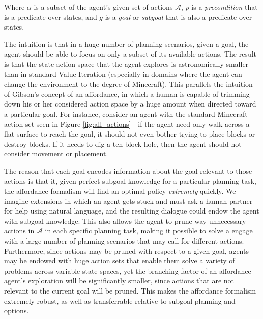 \documentclass[]{article}
\begin{document}
Where $\alpha$ is a subset of the agent's given set of actions 
$\mathcal{A}$, $p$ is a {\it precondition} that is a predicate over states, 
and $g$ is a {\it goal} or {\it subgoal} that is also a predicate over states.

The intuition is that in a huge number of planning scenarios, given a goal, the agent 
should be able to focus on only a subset of its available actions. The result is that the 
state-action space that the agent explores is astronomically smaller than in standard 
Value Iteration (especially in domains where the agent can change the environment 
to the degree of Minecraft). This parallels the intuition of Gibson's concept of an 
affordance, in which a human is capable of trimming down his or her considered 
action space by a huge amount when directed toward a particular goal. For instance, 
consider an agent with the standard Minecraft action set seen in Figure \ref{fig:all_actions} - 
if the agent need only walk across a flat surface to reach the goal, it should not 
even bother trying to place blocks or destroy blocks. If it needs to dig a ten block 
hole, then the agent should not consider movement or placement.

The reason that each goal encodes information about the goal relevant to 
those actions is that it, given perfect subgoal knowledge for a particular 
planning task, the affordance formalism will find an optimal policy {\it extremely}
 quickly. We imagine extensions in which an agent gets stuck and must ask 
 a human partner for help using natural language, and the resulting dialogue 
 could endow the agent with subgoal knowledge. This also allows the agent 
 to prune way unnecessary actions in $\mathcal{A}$ in each specific planning 
 task, making it possible to solve a engage with a large number of planning 
 scenarios that may call for different actions. Furthermore, since actions may 
 be pruned with respect to a given goal, agents may be endowed with huge 
 action sets that enable them solve a variety of problems across variable 
 state-spaces, yet the branching factor of an affordance agent's exploration 
 will be significantly smaller, since actions that are not relevant to the current 
 goal will be pruned. This makes the affordance formalism extremely robust, 
 as well as transferrable relative to subgoal planning and options.
\end{document}
